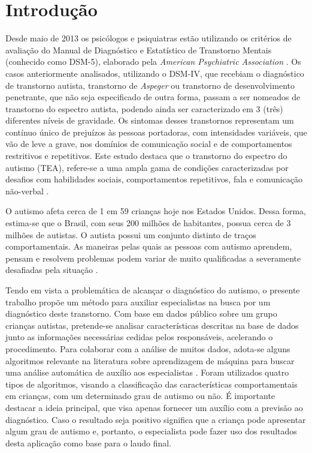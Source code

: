 \documentclass{template/sig-alternate-05-2015}
\begin{document}
\newpage

\section{Introdução}

Desde maio de 2013 os psicólogos e psiquiatras estão utilizando os
critérios de avaliação do Manual de Diagnóstico e Estatístico de
Transtorno Mentais (conhecido como DSM-5), elaborado pela
\textit{American Psychiatric Association} \cite{autismspeaks}. Os
casos anteriormente analisados, utilizando o DSM-IV, que recebiam o
diagnóstico de transtorno autista, transtorno de \emph{Aspeger} ou
transtorno de desenvolvimento penetrante, que não seja especificado de
outra forma, passam a ser nomeados de transtorno do espectro autista,
podendo ainda ser caracterizado em 3 (três) diferentes níveis de
gravidade. Os sintomas desses transtornos representam um contínuo
único de prejuízos às pessoas portadoras, com intensidades variáveis,
que vão de leve a grave, nos domínios de comunicação social e de
comportamentos restritivos e repetitivos. Este estudo destaca que o
transtorno do espectro do autismo (TEA), refere-se a uma ampla gama de
condições caracterizadas por desafios com habilidades sociais,
comportamentos repetitivos, fala e comunicação não-verbal
\cite{APA2014}.

O autismo afeta cerca de 1 em 59 crianças hoje nos Estados
Unidos. Dessa forma, estima-se que o Brasil, com seus 200 milhões de
habitantes, possua cerca de 3 milhões de autistas. O autista possui um
conjunto distinto de traços comportamentais. As maneiras pelas quais
as pessoas com autismo aprendem, pensam e resolvem problemas podem
variar de muito qualificadas a severamente desafiadas pela situação
\cite{de2019analise}.

Tendo em vista a problemática de alcançar o diagnóstico do autismo, o
presente trabalho propõe um método para auxiliar especialistas na
busca por um diagnóstico deste transtorno. Com base em dados público
sobre um grupo crianças autistas, pretende-se analisar características
descritas na base de dados junto as informações necessárias cedidas
pelos responsáveis, acelerando o procedimento. Para colaborar com a
análise de muitos dados, adota-se alguns algoritmos relevante na
literatura sobre aprendizagem de máquina para buscar uma análise
automática de auxílio aos especialistas
\cite{Talabani:2018,Thabtah:2018,Yuan:2012}. Foram utilizados quatro
tipos de algoritmos, visando a classificação das características
comportamentais em crianças, com um determinado grau de autismo ou
não. É importante destacar a ideia principal, que visa apenas fornecer
um auxílio com a previsão ao diagnóstico. Caso o resultado seja
positivo significa que a criança pode apresentar algum grau de autismo
e, portanto, o especialista pode fazer uso dos resultados desta
aplicação como base para o laudo final.
\end{document}
